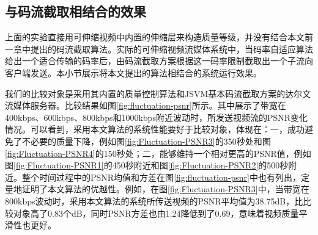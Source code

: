 \subsection{与码流截取相结合的效果}

上面的实验直接用可伸缩视频中内置的伸缩层来构造质量等级，并没有结合本文前一章中提出的码流截取算法。实际的可伸缩视频流媒体系统中，当码率自适应算法给出一个适合传输的码率后，由码流截取方案根据这一码率限制截取出一个子流向客户端发送。本小节展示将本文提出的算法相结合的系统运行效果。

我们的比较对象是采用其内置的质量控制算法和JSVM基本码流截取方案的达尔文流媒体服务器。比较结果如图\ref{fig:fluctuation-psnr}所示。其中展示了带宽在400kbps、600kbps、800kbps和1000kbps附近波动时，所发送视频流的PSNR变化情况。可以看到，采用本文算法的系统性能要好于比较对象，体现在：一，成功避免了不必要的质量下降，例如图\ref{fig:Fluctuation-PSNR3}的350秒处和图\ref{fig:Fluctuation-PSNR4}的150秒处；二，能够维持一个相对更高的PSNR值，例如图\ref{fig:Fluctuation-PSNR1}的450秒附近和图\ref{fig:Fluctuation-PSNR2}的500秒附近。整个时间过程中的PSNR均值和方差在图\ref{fig:fluctuation-psnr}中也有列出，定量地证明了本文算法的优越性。例如，在图\ref{fig:Fluctuation-PSNR3}中，当带宽在800kbps波动时，采用本文算法的系统所传送视频的PSNR平均值为38.75dB，比比较对象高了0.83个dB，同时PSNR方差也由1.24降低到了0.69，意味着视频质量平滑性也更好。

